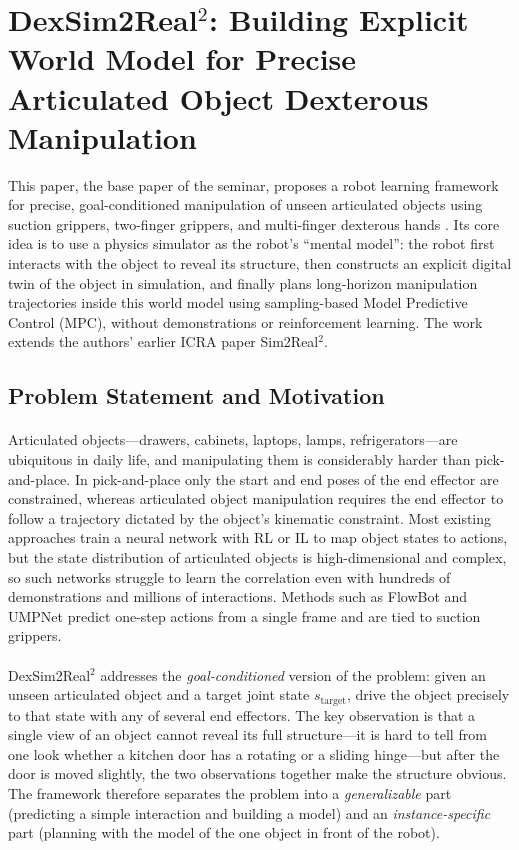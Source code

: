 \documentclass[12pt,a4paper,final]{extreport}
\begin{document}

\section{DexSim2Real$^2$: Building Explicit World Model for Precise Articulated Object Dexterous Manipulation}

This paper, the base paper of the seminar, proposes a robot learning framework for precise, goal-conditioned manipulation of unseen articulated objects using suction grippers, two-finger grippers, and multi-finger dexterous hands \cite{p1}. Its core idea is to use a physics simulator as the robot's ``mental model'': the robot first interacts with the object to reveal its structure, then constructs an explicit digital twin of the object in simulation, and finally plans long-horizon manipulation trajectories inside this world model using sampling-based Model Predictive Control (MPC), without demonstrations or reinforcement learning. The work extends the authors' earlier ICRA paper Sim2Real$^2$.

\subsection{Problem Statement and Motivation}

\paragraph{} Articulated objects---drawers, cabinets, laptops, lamps, refrigerators---are ubiquitous in daily life, and manipulating them is considerably harder than pick-and-place. In pick-and-place only the start and end poses of the end effector are constrained, whereas articulated object manipulation requires the end effector to follow a trajectory dictated by the object's kinematic constraint. Most existing approaches train a neural network with RL or IL to map object states to actions, but the state distribution of articulated objects is high-dimensional and complex, so such networks struggle to learn the correlation even with hundreds of demonstrations and millions of interactions. Methods such as FlowBot and UMPNet predict one-step actions from a single frame and are tied to suction grippers.

\paragraph{} DexSim2Real$^2$ addresses the \emph{goal-conditioned} version of the problem: given an unseen articulated object and a target joint state $s_{\mathrm{target}}$, drive the object precisely to that state with any of several end effectors. The key observation is that a single view of an object cannot reveal its full structure---it is hard to tell from one look whether a kitchen door has a rotating or a sliding hinge---but after the door is moved slightly, the two observations together make the structure obvious. The framework therefore separates the problem into a \emph{generalizable} part (predicting a simple interaction and building a model) and an \emph{instance-specific} part (planning with the model of the one object in front of the robot).
\end{document}
